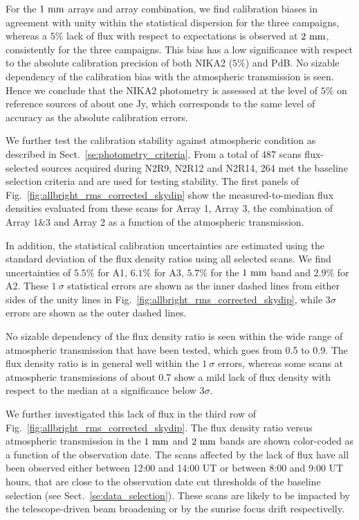 For the $1~\rm{mm}$ arrays and array combination, we find calibration
biases in agreement with unity within the statistical dispersion for
the three campaigns, whereas a $5\%$ lack of flux with respect to
expectations is observed at $2~\rm{mm}$, consistently for the three
campaigns. This bias has a low significance with respect to the
absolute calibration precision of both NIKA2 ($5\%$) and PdB.
No sizable dependency of the calibration bias with the
atmospheric transmission is seen. Hence we conclude that the NIKA2
photometry is assessed at the level of $5\%$ on reference sources of
about one Jy, which corresponds to the same level of accuracy as the
absolute calibration errors.   

We further test the calibration
stability against atmospheric condition as described in
Sect.~\ref{se:photometry_criteria}. From a total of 487 scans
flux-selected sources acquired during N2R9, N2R12 and N2R14, 264 met
the baseline selection criteria and are used for testing stability.
The first panels of Fig.~\ref{fig:allbright_rms_corrected_skydip} show the
measured-to-median flux densities evaluated from these scans for Array
1, Array 3, the combination of Array $1\&3$ and Array 2 as a function of the
atmospheric transmission.

In addition, the statistical calibration uncertainties are
estimated using the standard deviation of the flux density ratios
using all selected scans. We find uncertainties of $5.5\%$ for A1,
$6.1\%$ for A3, $5.7\%$ for the $1~\rm{mm}$ band and $2.9\%$ for A2.
These $1~\sigma$ statistical
errors are shown as the inner dashed lines from either sides of the
unity lines in Fig.~\ref{fig:allbright_rms_corrected_skydip}, while
$3\sigma$ errors are shown as the outer dashed lines.

No sizable dependency of the flux density ratio is seen within the
wide range of atmospheric transmission that have been tested, which goes
from 0.5 to 0.9. 
The flux density ratio is in general well within the $1~\sigma$ errors, whereas
some scans at atmospheric transmissions of about 0.7 show a mild lack
of flux density with respect to the median at a significance below
$3\sigma$.

We further investigated this lack of flux in the third row of
Fig.~\ref{fig:allbright_rms_corrected_skydip}. The flux density ratio
versus atmospheric transmission in the $1~\rm{mm}$ and $2~\rm{mm}$
bands are shown color-coded as a function of the observation date. The
scans affected by the lack of flux have all been observed 
either between 12:00 and 14:00 UT or between 8:00 and 9:00 UT hours,
that are close to the observation date cut thresholds of the baseline
selection (see Sect.~\ref{se:data_selection}). These scans are likely
to be impacted by the telescope-driven beam broadening or by the
sunrise focus drift respectivelly.

